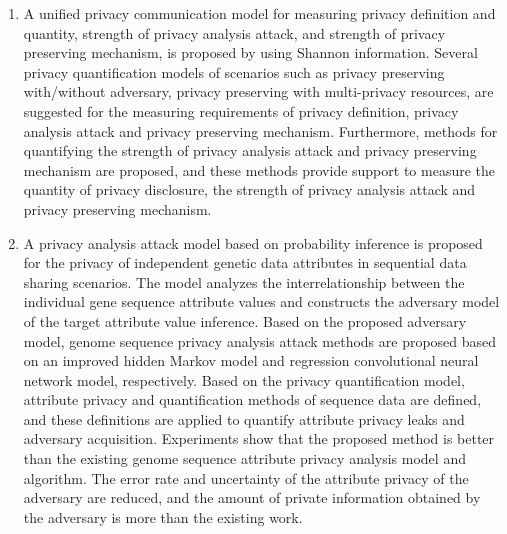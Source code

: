 \documentclass[pdftex,notypeinfo,twoside,openany,UTF8,fntef]{CASthesis}
\theoremstyle{THrm}{
	\newtheorem{question}{Question}[section]
	\newtheorem{property}{性质}[section]
	\newtheorem{assumption}{假设}[section]
	\newtheorem{claim}[lemma]{断言}
	
}
\begin{document}
\begin{enumerate}
	\item 	
	A unified privacy communication model for measuring privacy definition and quantity, strength of privacy analysis attack, and strength of privacy preserving mechanism, is proposed by using Shannon information. 
	Several privacy quantification models of scenarios such as privacy preserving with/without adversary, privacy preserving with multi-privacy resources, are suggested for the measuring requirements of privacy definition, privacy analysis attack and privacy preserving mechanism. Furthermore, methods for quantifying the strength of  privacy analysis attack and privacy preserving mechanism are proposed, and these methods provide support to measure the quantity of privacy disclosure, the strength of  privacy analysis attack and privacy preserving mechanism.%
	
	\item 	
	A privacy analysis attack model based on probability inference is proposed for the privacy of independent genetic data attributes in sequential data sharing scenarios. The model analyzes the interrelationship between the individual gene sequence attribute values and constructs the adversary model of the target attribute value inference. Based on the proposed adversary model, genome sequence privacy analysis attack methods are proposed based on an improved hidden Markov model and regression convolutional neural network model, respectively. Based on the privacy quantification model, attribute privacy and quantification methods of sequence data are defined, and these definitions are applied to quantify attribute privacy leaks and adversary acquisition. Experiments show that the proposed method is better than the existing genome sequence attribute privacy analysis model and algorithm. The error rate and uncertainty of the attribute privacy of the adversary are reduced, and the amount of private information obtained by the adversary is more than the existing work.
	

\end{enumerate}
\end{document}
